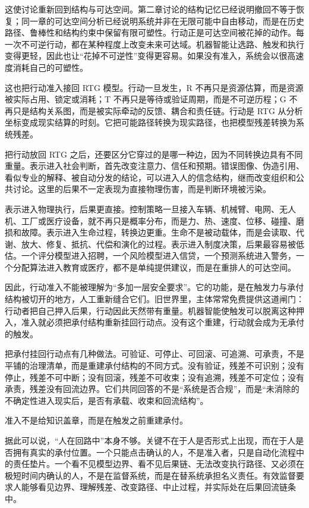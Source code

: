 
这使讨论重新回到结构与可达空间。第二章讨论的结构记忆已经说明撤回不等于恢复；同一章的可达空间分析已经说明系统并非在无限可能中自由移动，而是在历史路径、鲁棒性和结构约束中保留有限可塑性。行动正是可达空间被花掉的动作。每一次不可逆行动，都在某种程度上改变未来可达域。机器智能让选路、触发和执行变得更轻，因此也让“花掉不可逆性”变得更容易。如果没有准入，系统会以很高速度消耗自己的可塑性。

这也把行动准入接回 RTG 模型。行动一旦发生，R 不再只是资源估算，而是资源被实际占用、锁定或消耗；T 不再只是等待或验证周期，而是不可逆历程；G 不再只是结构关系图，而是被实际牵动的反馈、耦合和责任链。行动是 RTG 从分析坐标变成现实结算的时刻。它把可能路径转换为现实路径，也把模型残差转换为系统残差。

把行动放回 RTG 之后，还要区分它穿过的是哪一种边，因为不同转换边具有不同重量。表示进入社会判断，首先改变注意力、信任和预期。错误图像、伪造引用、看似专业的解释、被自动分发的结论，可以进入人的信念结构，继而改变组织和公共讨论。这里的后果不一定表现为直接物理伤害，而是判断环境被污染。

表示进入物理执行，后果更直接。控制策略一旦接入车辆、机械臂、电网、无人机、工厂或医疗设备，就不再只是概率分布，而是力、热、速度、位移、碰撞、磨损和故障。表示进入生命过程，转换边更重。生命不是被动载体，而是会读取、代谢、放大、修复、抵抗、代偿和演化的过程。表示进入制度决策，后果最容易被低估。一个评分模型进入招聘，一个风险模型进入信贷，一个预测系统进入警务，一个分配算法进入教育或医疗，都不是单纯提供建议，而是在重排人的可达空间\cite{oneil2016weapons}。


因此，行动准入不能被理解为“多加一层安全要求”。它的功能，是在触发力与承付结构被切开的地方，人工重新缝合它们。旧世界里，主体常常免费提供这道闸门：行动者把自己押入后果，行动因此天然带有重量。机器智能使触发可以脱离这种押入，准入就必须把承付结构重新挂回行动点。没有这个重建，行动就会成为无承付的触发。

把承付挂回行动点有几种做法。可验证、可停止、可回滚、可追溯、可承责，不是平铺的治理清单，而是重建承付结构的不同方式。没有验证，残差不可识别；没有停止，残差不可中断；没有回滚，残差不可收束；没有追溯，残差不可定位；没有承责，残差没有回流边界。它们共同回答的不是“系统是否合规”，而是“未消除的不确定性进入现实后，是否有承载、收束和回流结构”。

准入不是给知识盖章，而是在触发之前重建承付。

据此可以说，“人在回路中”本身不够。关键不在于人是否形式上出现，而在于人是否拥有真实的承付位置。一个只能点击确认的人，不是准入者，只是自动化流程中的责任垫片。一个看不见模型边界、看不见后果链、无法改变执行路径、又必须在极短时间内确认的人，不是在监督系统，而是在替系统承担名义责任。有效监督要求人能够看见边界、理解残差、改变路径、中止过程，并实际处在后果回流链条中\cite{santoni2018meaningful}。

